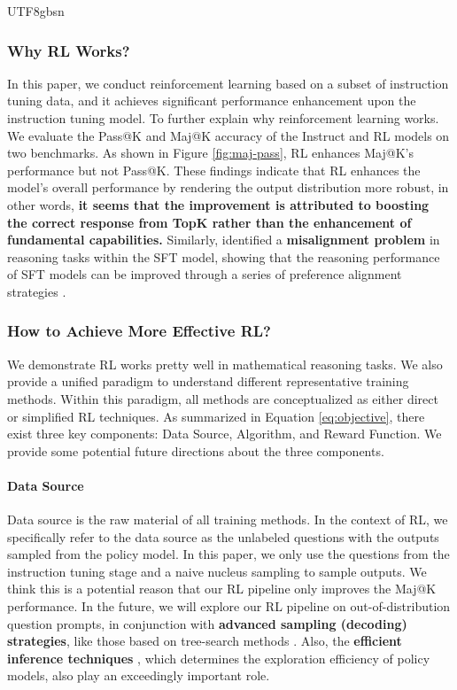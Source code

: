 \documentclass[11pt, a4paper, logo, copyright, nonumbering]{deepseek}
\begin{document}
\begin{CJK*}{UTF8}{gbsn}
\subsubsection{Why RL Works?}
In this paper, we conduct reinforcement learning based on a subset of instruction tuning data, and it achieves significant performance enhancement upon the instruction tuning model. To further explain why reinforcement learning works.
We evaluate the Pass@K and Maj@K accuracy of the Instruct and RL models on two benchmarks.
As shown in Figure \ref{fig:maj-pass}, RL enhances Maj@K’s performance but not Pass@K. These findings indicate that RL enhances the model's overall performance by rendering the output distribution more robust, in other words, \textbf{it seems that the improvement is attributed to boosting the correct response from TopK rather than the enhancement of fundamental capabilities.} Similarly, \citep{wang2023making} identified a \textbf{misalignment problem} in reasoning tasks within the SFT model, showing that the reasoning performance of SFT models can be improved through a series of preference alignment strategies \citep{yuan2023rrhf,song2023preference,wang2023making}.


\subsubsection{How to Achieve More Effective RL?}
\label{sec:effec_rl}
We demonstrate RL works pretty well in mathematical reasoning tasks. We also provide a unified paradigm to understand different representative training methods.
Within this paradigm, all methods are conceptualized as either direct or simplified  RL techniques. 
As summarized in Equation \ref{eq:objective}, there exist three key components: Data Source, Algorithm, and Reward Function. We provide some potential future directions about the three components.


\paragraph{Data Source} Data source is the raw material of all training methods.
In the context of RL, we specifically refer to the data source as the unlabeled questions with the outputs sampled from the policy model. In this paper, we only use the questions from the instruction tuning stage and a naive nucleus sampling to sample outputs. We think this is a potential reason that 
our RL pipeline only improves the Maj@K performance. In the future, we will explore our RL pipeline on out-of-distribution question prompts, in conjunction with \textbf{advanced sampling (decoding) strategies}, like those based on tree-search methods \citep{yao2023tree}.
Also, the  \textbf{efficient inference techniques} \citep{xia-etal-2023-speculative,leviathan2023fast,kwon2023efficient,xia2024unlocking}, which determines the exploration efficiency of policy models, also play an exceedingly important role.




\end{CJK*}
\end{document}
